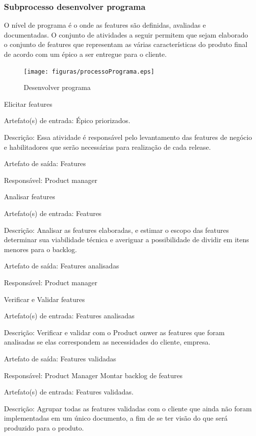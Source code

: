 \subsubsection{Subprocesso desenvolver programa}

O nível de programa é o onde as features são definidas, avaliadas e documentadas. O conjunto de atividades a seguir permitem que sejam elaborado o conjunto de features que representam as várias características do produto final de acordo com um épico a ser entregue para o cliente.

\begin{figure}[H]
    \centering
    \caption{Desenvolver programa}
    \label{processoPrograma}
    \texttt{[image: figuras/processoPrograma.eps]}
\end{figure}




Elicitar features

Artefato(s) de entrada: Épico priorizados.

Descrição: Essa atividade é responsável pelo levantamento das features de negócio e habilitadores que serão necessárias para realização de cada release.

Artefato de saída: Features

Responsável: Product manager

Analisar features

Artefato(s) de entrada: Features

Descrição: Analisar as features elaboradas, e estimar o escopo das features determinar sua viabilidade técnica e averiguar a possibilidade de dividir em itens menores para o backlog.

Artefato de saída: Features analisadas

Responsável: Product manager

Verificar e Validar features

Artefato(s) de entrada: Features analisadas

Descrição: Verificar e validar com o Product onwer as features que foram analisadas se elas correspondem as necessidades do cliente, empresa.

Artefato de saída: Features validadas

Responsável: Product Manager
Montar backlog de features

Artefato(s) de entrada: Features validadas.

Descrição: Agrupar todas as features validadas com o cliente que ainda não foram implementadas em um único documento, a fim de se ter visão do que será produzido para o produto.

